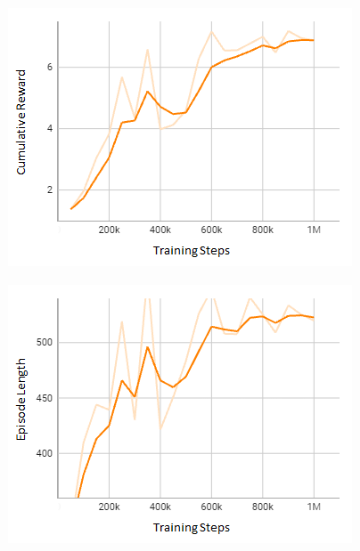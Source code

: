 \documentclass[letterpaper, 10 pt, conference]{ieeeconf}  %
\begin{document}
\begin{figure}[t]
     \centering
     \begin{subfigure}[b]{0.16\linewidth}
         \centering
         \includegraphics[width=\linewidth]{Fig5a.png}
         \caption{}
         \label{fig5a}
     \end{subfigure}
     \hfill
     \begin{subfigure}[b]{0.16\linewidth}
         \centering
         \includegraphics[width=\linewidth]{Fig5b.png}
         \caption{}
         \label{fig5b}
     \end{subfigure}
     \hfill
     \begin{subfigure}[b]{0.16\linewidth}
         \centering

\end{subfigure}
\end{figure}
\end{document}
